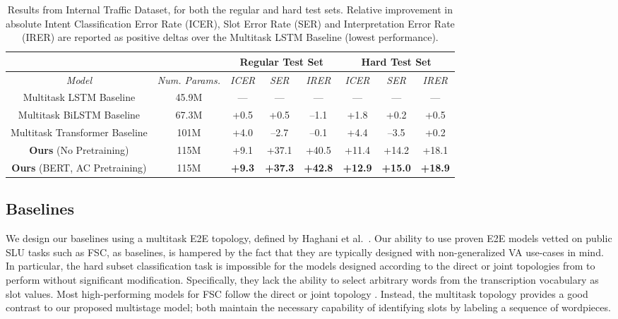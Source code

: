 \begin{table*}[ht!]
	\small
	\centering
		\caption{Results from Internal Traffic Dataset, for both the regular and hard test sets. Relative improvement in absolute Intent Classification Error Rate (ICER), Slot Error Rate (SER) and Interpretation Error Rate (IRER) are reported as positive deltas over the Multitask LSTM Baseline (lowest performance). }
	\label{tab:alexaresults}
\begin{tabular}{cccccccc}
		\cline{3-8}
		\multicolumn{2}{c}{} & \multicolumn{3}{c}{Regular Test Set} &  \multicolumn{3}{c}{Hard Test Set} \\
		\hline 
		\textit{Model} & \textit{Num. Params.} & \textit{ICER}  & \textit{SER}  & \textit{IRER} &  \textit{ICER}  & \textit{SER} &  \textit{IRER}  \\ \specialrule{.1em}{.05em}{.05em}
Multitask LSTM Baseline &  45.9M  &--- & --- & --- & --- & --- & --- \\
Multitask BiLSTM Baseline & 67.3M  &+0.5 & +0.5 & --1.1 & +1.8 & +0.2 & +0.5 \\
Multitask Transformer Baseline &  101M  &+4.0 & --2.7 & --0.1 & +4.4 & --3.5 & +0.2 \\ \hline
\textbf{Ours} (No Pretraining) &  115M  &+9.1 & +37.1 & +40.5 & +11.4 & +14.2 & +18.1 \\
\textbf{Ours} (BERT, AC Pretraining) &  115M  & \textbf{+9.3} & \textbf{+37.3} & \textbf{+42.8} & \textbf{+12.9} & \textbf{+15.0} & \textbf{+18.9} \\
		\hline
	\end{tabular}
\end{table*}


\subsection{Baselines}
We design our baselines using a multitask E2E topology, defined by Haghani et al.~\cite{haghani2018audio}.
Our ability to use proven E2E models vetted on public SLU tasks such as FSC, as baselines, is hampered by the fact that they are typically designed with non-generalized VA use-cases in mind. In particular, the hard subset classification task is impossible for the models designed according to the direct or joint topologies from \cite{haghani2018audio} to perform without significant modification. Specifically, they lack the ability to select arbitrary words from the transcription vocabulary as slot values. Most high-performing models for FSC follow the direct or joint topology \cite{radfar2020end,kim2020st, lugosch2020using}. Instead, the multitask topology \cite{haghani2018audio} provides a good contrast to our proposed multistage model; both maintain the necessary capability of identifying slots by labeling a sequence of wordpieces.

